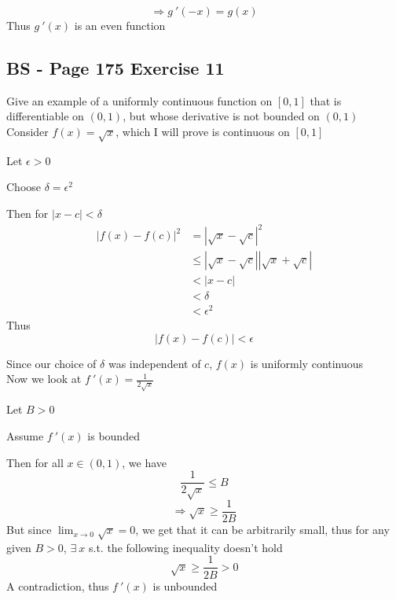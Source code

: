 \documentclass{article}
\begin{document}
\[
\Rightarrow g \ ' (-x) = g(x) 
\]
Thus \(g \ ' (x)\) is an even function

\subsection*{BS - Page 175 Exercise 11}
Give an example of a uniformly continuous function on \([0,1]\) that is differentiable on \((0,1)\), but whose derivative is 
not bounded on \((0,1)\)
\\

Consider \(f(x)= \sqrt{x}\), which I will prove is continuous on \([0,1]\)

Let \(\epsilon >0\)

Choose \(\delta = \epsilon^2 \)

Then for \(|x-c| < \delta\)
\begin{align*}
    |f(x)-f(c)|^2 &= |\sqrt{x} - \sqrt{c}|^2 \\
    &\leq |\sqrt{x} - \sqrt{c}||\sqrt{x} + \sqrt{c}| \\
    &< |x-c| \\
    &< \delta \\
    &< \epsilon^2
\end{align*}
Thus
\[
|f(x)- f(c)| < \epsilon 
\]

Since our choice of \(\delta\) was independent of \(c\), \(f(x)\) is uniformly continuous
\\

Now we look at \(f \ ' (x) = \frac{1}{2\sqrt{x}}\)

Let \(B >0\)

Assume \(f \ ' (x)\) is bounded

Then for all \(x \in (0,1)\), we have
\[
\frac{1}{2\sqrt{x}} \leq B 
\]
\[
\Rightarrow \sqrt{x} \geq \frac{1}{2B}
\]
But since \(\lim_{x\to0}{\sqrt{x}}=0\), we get that it can be arbitrarily small, thus 
for any given \(B>0\), \(\exists \ x\) s.t. the following inequality doesn't hold
\[
\sqrt{x} \geq \frac{1}{2B} > 0
\]
A contradiction, thus \(f \ ' (x)\) is unbounded
\end{document}
